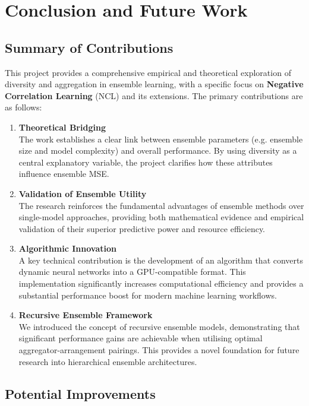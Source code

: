 \section{Conclusion and Future Work}
\label{sec:conclusion}


\subsection{Summary of Contributions}
This project provides a comprehensive empirical and theoretical exploration of diversity and aggregation in ensemble learning, with a specific focus on \textbf{Negative Correlation Learning} (NCL) and its extensions. The primary contributions are as follows: 
\begin{enumerate}
    \item \textbf{Theoretical Bridging} \\
    The work establishes a clear link between ensemble parameters (e.g. ensemble size and model complexity) and overall performance. By using diversity as a central explanatory variable, the project clarifies how these attributes influence ensemble MSE. 

    \item \textbf{Validation of Ensemble Utility} \\
    The research reinforces the fundamental advantages of ensemble methods over single-model approaches, providing both mathematical evidence and empirical validation of their superior predictive power and resource efficiency. 

    \item \textbf{Algorithmic Innovation} \\
    A key technical contribution is the development of an algorithm that converts dynamic neural networks into a GPU-compatible format. This implementation significantly increases computational efficiency and provides a substantial performance boost for modern machine learning workflows. 

    \item \textbf{Recursive Ensemble Framework} \\
    We introduced the concept of recursive ensemble models, demonstrating that significant performance gains are achievable when utilising optimal aggregator-arrangement pairings. This provides a novel foundation for future research into hierarchical ensemble architectures. 
\end{enumerate}


\subsection{Potential Improvements}
